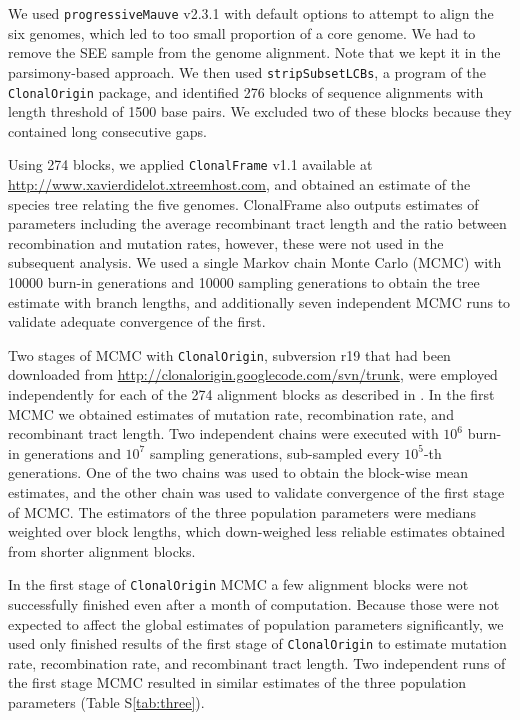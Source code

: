 \documentclass[english]{article}
\begin{document}
We used \texttt{progressiveMauve} v2.3.1 \citep{Darling2004,Darling2010} with
default options to attempt to align the six genomes, which led to too small
proportion of a core genome. We had to remove the SEE sample from the genome
alignment. Note that we kept it in the parsimony-based approach.  We then used
\texttt{stripSubsetLCBs}, a program of the \texttt{ClonalOrigin} package, and
identified 276 blocks of sequence alignments with length threshold of 1500 base
pairs.  We excluded two of these blocks because they contained long consecutive
gaps.

Using 274 blocks, we applied \texttt{ClonalFrame} v1.1 available at
\url{http://www.xavierdidelot.xtreemhost.com}, and obtained an estimate of the
species tree relating the five genomes. ClonalFrame also outputs estimates of
parameters including the average recombinant tract length and the ratio between
recombination and mutation rates, however, these were not used in the subsequent
analysis. We used a single Markov chain Monte Carlo (MCMC) with 10000 burn-in
generations and 10000 sampling generations to obtain the tree estimate with
branch lengths, and additionally seven independent MCMC runs to validate
adequate convergence of the first.

Two stages of MCMC with \texttt{ClonalOrigin}, subversion r19 that had been
downloaded from \url{http://clonalorigin.googlecode.com/svn/trunk}, were
employed independently for each of the 274 alignment blocks as described in
\citet{Didelot2010}.   In the first MCMC we obtained estimates of mutation rate,
recombination rate, and recombinant tract length.  Two independent chains were
executed with $10^6$ burn-in generations and $10^7$ sampling generations,
sub-sampled every $10^5$-th generations. One of the two chains was used to
obtain the block-wise mean estimates, and the other chain was used to validate
convergence of the first stage of MCMC.  The estimators of the three population
parameters were medians weighted over block lengths, which down-weighed less
reliable estimates obtained from shorter alignment blocks.  

In the first stage of \texttt{ClonalOrigin} MCMC a few alignment blocks were not
successfully finished even after a month of computation.  Because those were not
expected to affect the global estimates of population parameters significantly,
we used only finished results of the first stage of \texttt{ClonalOrigin} to
estimate mutation rate, recombination rate, and recombinant tract length.  Two
independent runs of the first stage MCMC resulted in similar estimates of the
three population parameters (Table S\ref{tab:three}).
\end{document}
